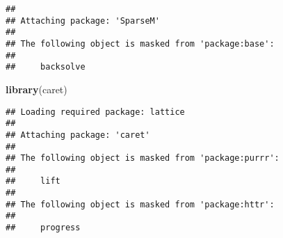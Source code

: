 \documentclass[
]{article}
\newenvironment{Shaded}{\begin{snugshade}}{\end{snugshade}}
\newcommand{\FunctionTok}[1]{\textcolor[rgb]{0.13,0.29,0.53}{\textbf{#1}}}
\newcommand{\NormalTok}[1]{#1}
\begin{document}
\begin{verbatim}
## 
## Attaching package: 'SparseM'
## 
## The following object is masked from 'package:base':
## 
##     backsolve
\end{verbatim}

\begin{Shaded}
\begin{Highlighting}[]
\FunctionTok{library}\NormalTok{(caret)}
\end{Highlighting}
\end{Shaded}

\begin{verbatim}
## Loading required package: lattice
## 
## Attaching package: 'caret'
## 
## The following object is masked from 'package:purrr':
## 
##     lift
## 
## The following object is masked from 'package:httr':
## 
##     progress
\end{verbatim}
\end{document}

